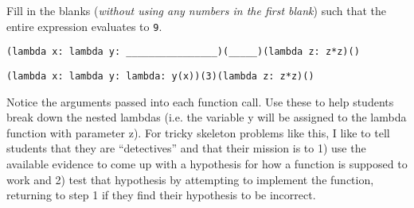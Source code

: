 \begin{blocksection}
\question Fill in the blanks (\emph{without using any numbers in the first blank}) such that the entire expression evaluates to \texttt{9}.

\ifprintanswers\else
\begin{lstlisting}
(lambda x: lambda y: ________________)(_____)(lambda z: z*z)()
\end{lstlisting}
\vspace{40 mm}
\fi

\begin{solution}[0in]
\begin{lstlisting}
(lambda x: lambda y: lambda: y(x))(3)(lambda z: z*z)()
\end{lstlisting}
\end{solution}
\end{blocksection}

\begin{questionmeta}
  Notice the arguments passed into each function call. Use these to help students break down the nested lambdas (i.e. the variable y will be assigned to the lambda function with parameter z). For tricky skeleton problems like this, I like to tell students that they are ``detectives'' and that their mission is to 1) use the available evidence to come up with a hypothesis for how a function is supposed to work and 2) test that hypothesis by attempting to implement the function, returning to step 1 if they find their hypothesis to be incorrect. 
\end{questionmeta}
